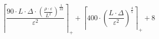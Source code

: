 \[\left\lceil \frac{90 \cdot L \cdot \Delta \cdot \left(\frac{\rho \cdot \varepsilon}{L^{2}}\right)^{\frac{1}{22}}}{\varepsilon^{2}} \right\rceil_{+} + \left\lceil 400 \cdot \left(\frac{L \cdot \Delta}{\varepsilon^{2}}\right)^{\frac{4}{5}} \right\rceil_{+} + 8\]
